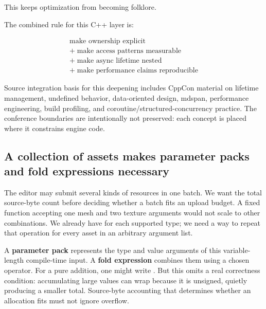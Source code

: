 This keeps optimization from becoming folklore.

The combined rule for this C++ layer is:

\[\boxed{\begin{gathered}\text{make ownership explicit}\\+\;\text{make access patterns measurable}\\+\;\text{make async lifetime nested}\\+\;\text{make performance claims reproducible}\end{gathered}}\]

Source integration basis for this deepening includes CppCon material on lifetime management, undefined behavior, data-oriented design, mdspan, performance engineering, build profiling, and coroutine/structured-concurrency practice. The conference boundaries are intentionally not preserved: each concept is placed where it constrains engine code.

\subsection{A collection of assets makes parameter packs and fold expressions necessary}\label{01-foundations-i-ch005-a-collection-of-assets-makes-parameter-packs-and-fold-expressions-necessary}

\hypertarget{01-foundations-i-ch005-a-collection-of-assets-makes-parameter-packs-and-fold-expressions-necessary}{}

The editor may submit several kinds of resources in one batch. We want the total source-byte count before deciding whether a batch fits an upload budget. A fixed function accepting one mesh and two texture arguments would not scale to other combinations. We already have  for each supported type; we need a way to repeat that operation for every asset in an arbitrary argument list.

A \textbf{parameter pack} represents the type and value arguments of this variable-length compile-time input. A \textbf{fold expression} combines them using a chosen operator. For a pure addition, one might write . But this omits a real correctness condition: accumulating large  values can wrap because it is unsigned, quietly producing a smaller total. Source-byte accounting that determines whether an allocation fits must not ignore overflow.

